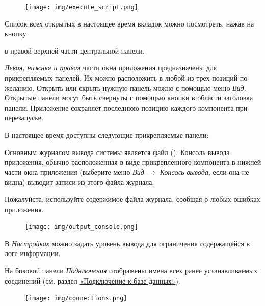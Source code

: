 	\begin{figure}[H]
		\centering
		\texttt{[image: img/execute\_script.png]}
	\end{figure}

Список всех открытых в настоящее время вкладок можно посмотреть, нажав на кнопку  в правой верхней части центральной панели.


\textit{Левая, нижняя и правая} части окна приложения предназначены для прикрепляемых панелей. Их можно расположить в любой из трех позиций по желанию. Открыть или скрыть нужную панель можно с помощью меню \textit{Вид}. Открытые панели могут быть свернуты с помощью кнопки в области заголовка панели. Приложение сохраняет последнюю позицию каждого компонента при перезапуске.

В настоящее время доступны следующие прикрепляемые панели:


Основным журналом вывода системы является файл  (). Консоль вывода приложения, обычно расположенная в виде прикрепленного компонента в нижней части окна приложения (выберите меню \textit{Вид} $\rightarrow$ \textit{Консоль вывода}, если она не видна) выводит записи из этого файла журнала.

\begin{redremark}
Пожалуйста, используйте содержимое файла журнала, сообщая о любых ошибках приложения.
\end{redremark}

\begin{figure}[H]
	\centering
	\texttt{[image: img/output\_console.png]}
\end{figure}

 В \textit{Настройках} можно задать уровень вывода для ограничения содержащейся в логе информации.


На боковой панели \textit{Подключения} отображены имена всех ранее устанавливаемых соединений (см. раздел \hyperref[sec:connections]{«Подключение к базе данных»}). 

\begin{figure}[H]
	\centering
	\texttt{[image: img/connections.png]}
\end{figure}

